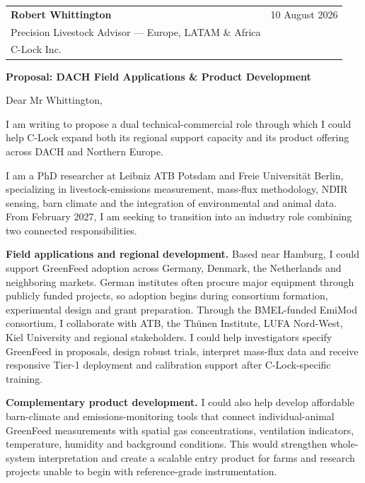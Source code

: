 \documentclass[10pt,a4paper]{article}
\begin{document}
\fontsize{10}{12.5}\selectfont
\brandheader

\begin{tabularx}{\textwidth}{@{}Xr@{}}
\textbf{Robert Whittington} & 10 August 2026\\
Precision Livestock Advisor --- Europe, LATAM \& Africa &\\
C-Lock Inc. &
\end{tabularx}

\vspace{6pt}
{\brandfont\fontsize{13}{15}\selectfont\bfseries\color{fieldgreen}Proposal: DACH Field Applications \& Product Development}
\vspace{4pt}

Dear Mr Whittington,

I am writing to propose a dual technical-commercial role through which I could help C-Lock expand both its regional support capacity and its product offering across DACH and Northern Europe.

I am a PhD researcher at Leibniz ATB Potsdam and Freie Universität Berlin, specializing in livestock-emissions measurement, mass-flux methodology, NDIR sensing, barn climate and the integration of environmental and animal data. From February 2027, I am seeking to transition into an industry role combining two connected responsibilities.

\textbf{Field applications and regional development.} Based near Hamburg, I could support GreenFeed adoption across Germany, Denmark, the Netherlands and neighboring markets. German institutes often procure major equipment through publicly funded projects, so adoption begins during consortium formation, experimental design and grant preparation. Through the BMEL-funded EmiMod consortium, I collaborate with ATB, the Thünen Institute, LUFA Nord-West, Kiel University and regional stakeholders. I could help investigators specify GreenFeed in proposals, design robust trials, interpret mass-flux data and receive responsive Tier-1 deployment and calibration support after C-Lock-specific training.

\textbf{Complementary product development.} I could also help develop affordable barn-climate and emissions-monitoring tools that connect individual-animal GreenFeed measurements with spatial gas concentrations, ventilation indicators, temperature, humidity and background conditions. This would strengthen whole-system interpretation and create a scalable entry product for farms and research projects unable to begin with reference-grade instrumentation.
\end{document}
